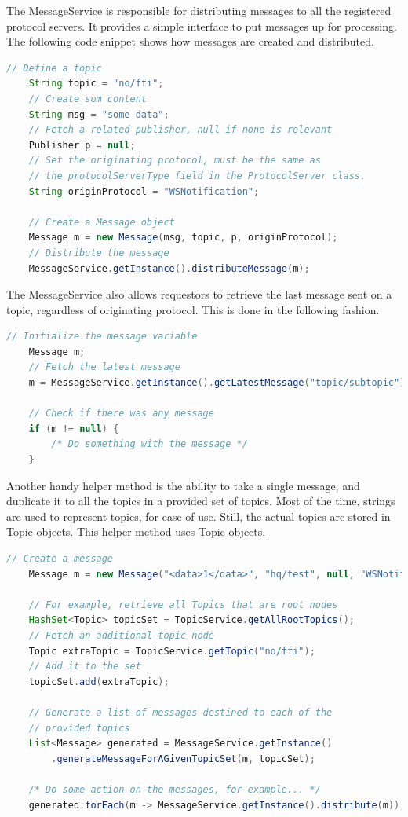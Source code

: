 The MessageService is responsible for distributing messages to all the registered protocol servers. It provides a simple interface to put messages up for processing. The following code snippet shows how messages are created and distributed.

\begin{lstlisting}[language=Java, captionpos=b, caption=Distributing a message, frame=bt, showstringspaces=false]
    // Define a topic
    String topic = "no/ffi";
    // Create som content
    String msg = "some data";
    // Fetch a related publisher, null if none is relevant
    Publisher p = null;
    // Set the originating protocol, must be the same as
    // the protocolServerType field in the ProtocolServer class.
    String originProtocol = "WSNotification";
    
    // Create a Message object
    Message m = new Message(msg, topic, p, originProtocol);
    // Distribute the message
    MessageService.getInstance().distributeMessage(m);
\end{lstlisting}

The MessageService also allows requestors to retrieve the last message sent on a topic, regardless of originating protocol. This is done in the following fashion.

\begin{lstlisting}[language=Java, captionpos=b, caption=Retrieving latest message on a topic, frame=bt, showstringspaces=false]
    // Initialize the message variable
    Message m;
    // Fetch the latest message
    m = MessageService.getInstance().getLatestMessage("topic/subtopic");
    
    // Check if there was any message
    if (m != null) {
        /* Do something with the message */
    }
\end{lstlisting}

Another handy helper method is the ability to take a single message, and duplicate it to all the topics in a provided set of topics. Most of the time, strings are used to represent topics, for ease of use. Still, the actual topics are stored in Topic objects. This helper method uses Topic objects.

\begin{lstlisting}[language=Java, captionpos=b, caption=Duplicating message to multiple topics, frame=bt, showstringspaces=false]
    // Create a message
    Message m = new Message("<data>1</data>", "hq/test", null, "WSNotification");

    // For example, retrieve all Topics that are root nodes
    HashSet<Topic> topicSet = TopicService.getAllRootTopics();
    // Fetch an additional topic node
    Topic extraTopic = TopicService.getTopic("no/ffi");
    // Add it to the set
    topicSet.add(extraTopic);
    
    // Generate a list of messages destined to each of the
    // provided topics
    List<Message> generated = MessageService.getInstance()
        .generateMessageForAGivenTopicSet(m, topicSet);
        
    /* Do some action on the messages, for example... */
    generated.forEach(m -> MessageService.getInstance().distribute(m));
\end{lstlisting}

